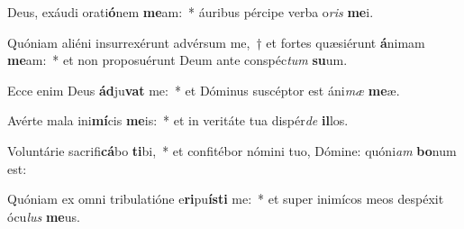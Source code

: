 \item Deus, exáudi orati\textbf{ó}nem \textbf{me}am:~* áuribus pércipe verba o\textit{ris} \textbf{me}i.
\item Quóniam aliéni insurrexérunt advérsum me,~† et fortes quæsiérunt \textbf{á}nimam \textbf{me}am:~* et non proposuérunt Deum ante conspéc\textit{tum} \textbf{su}um.
\item Ecce enim Deus \textbf{ád}ju\textbf{vat} me:~* et Dóminus suscéptor est áni\textit{mæ} \textbf{me}æ.
\item Avérte mala ini\textbf{mí}cis \textbf{me}is:~* et in veritáte tua dispér\textit{de} \textbf{il}los.
\item Voluntárie sacrifi\textbf{cá}bo \textbf{ti}bi,~* et confitébor nómini tuo, Dómine: quóni\textit{am} \textbf{bo}num est:
\item Quóniam ex omni tribulatióne e\textbf{ri}pu\textbf{ís}\textbf{ti} me:~* et super inimícos meos despéxit ócu\textit{lus} \textbf{me}us.
